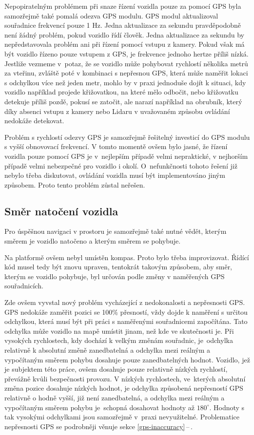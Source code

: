 \documentclass[czech, bachelor]{diploma}
\newcommand{\filipref}[1]{\ref{#1}\,--\,\nameref{#1}}
\begin{document}
Nepopiratelným problémem při snaze řízení vozidla pouze za pomocí GPS byla samozřejmě také pomalá odezva GPS modulu. GPS modul
aktualizoval souřadnice frekvencí pouze 1 Hz. Jedna aktualizace za sekundu pravděpodobně není žádný problém, pokud vozidlo řídí
člověk. Jedna aktualizace za sekundu by nepředstavovala problém ani při řízení pomocí vstupu z kamery. Pokud však má být vozidlo
řízeno pouze vstupem z GPS, je frekvence jednoho hertze příliš nízká. Jestliže vezmeme v~potaz, že se vozidlo může pohybovat
rychlostí několika metrů za vteřinu, zvláště poté v kombinaci s nepřesnou GPS, která může naměřit lokaci s odchylkou více než
jeden metr, mohlo by v praxi jednoduše dojít k situaci, kdy vozidlo například projede křižovatkou, na které mělo odbočit, nebo
křižovatku detekuje příliš pozdě, pokusí se zatočit, ale narazí například na obrubník, který díky absenci vstupu z kamery nebo
Lidaru v uvažovaném způsobu ovládání nedokáže detekovat.

Problém s rychlostí odezvy GPS je samozřejmě řešitelný investicí do GPS modulu s vyšší obnovovací frekvencí. V tomto momentě ovšem
bylo jasné, že řízení vozidla pouze pomocí GPS je v~nejlepším případě velmi nepraktické, v nejhorším případě velmi nebezpečné
pro vozidlo i okolí. O~nefunkčnosti tohoto řešení již nebylo třeba diskutovat, ovládání vozidla musí být implementováno jiným
způsobem. Proto tento problém zůstal neřešen.

\subsection{Směr natočení vozidla} \label{directions-and-angles}

Pro úspěšnou navigaci v prostoru je samozřejmě také nutné vědět, kterým směrem je vozidlo natočeno a kterým směrem se pohybuje.

Na platformě ovšem nebyl umístěn kompas. Proto bylo třeba improvizovat. Řídící kód musel tedy být znovu upraven, tentokrát takovým
způsobem, aby směr, kterým se vozidlo pohybuje, byl určován podle změny v naměřených GPS souřadnicích.

Zde ovšem vyvstal nový problém vycházející z nedokonalosti a nepřesnosti GPS. GPS nedokáže zaměřit pozici se 100\% přesností,
vždy dojde k naměření s určitou odchylkou, která musí být při práci s naměřenými souřadnicemi započítána. Tato odchylka může
vozidlo na mapě umístit jinam, než kde ve skutečnosti je. Při vysokých rychlostech, kdy dochází k velkým změnám souřadnic,
je~odchylka relativně k absolutní změně zanedbatelná a odchylka mezi reálným a vypočítaným směrem pohybu dosahuje pouze
zanedbatelných hodnot. Vozidlo, jež je subjektem této práce, ovšem dosahuje pouze relativně nízkých rychlostí, převážně kvůli
bezpečnosti provozu. V nízkých rychlostech, ve~kterých absolutní změna pozice dosahuje nízkých hodnot, je odchylka způsobená
nepřesností GPS relativně o hodně vyšší, již není zanedbatelná, a odchylka mezi reálným a vypočítaným směrem pohybu je~schopná
dosahovat hodnoty až $180^{\circ}$. Hodnoty s tak vysokými odchylkami jsou samozřejmě v~praxi nevyužitelné. Problematice
nepřesnosti GPS se podrobněji věnuje sekce \filipref{gps-inaccuracy}.
\end{document}
